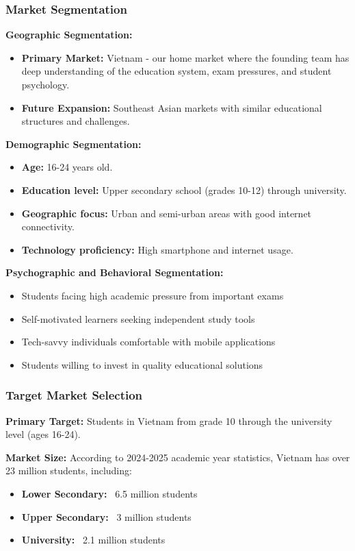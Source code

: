 \subsubsection{Market Segmentation}
\textbf{Geographic Segmentation:}
\begin{itemize}
    \item \textbf{Primary Market:}
        Vietnam - our home market where the founding team has deep understanding of the education system, exam
        pressures, and student psychology.
    \item \textbf{Future Expansion:}
        Southeast Asian markets with similar educational structures and challenges.
\end{itemize}

\textbf{Demographic Segmentation:}
\begin{itemize}
    \item \textbf{Age:} 16-24 years old.
    \item \textbf{Education level:} Upper secondary school (grades 10-12) through university.
    \item \textbf{Geographic focus:} Urban and semi-urban areas with good internet connectivity.
    \item \textbf{Technology proficiency:} High smartphone and internet usage.
\end{itemize}

\textbf{Psychographic and Behavioral Segmentation:}
\begin{itemize}
    \item Students facing high academic pressure from important exams
    \item Self-motivated learners seeking independent study tools
    \item Tech-savvy individuals comfortable with mobile applications
    \item Students willing to invest in quality educational solutions
\end{itemize}

\subsubsection{Target Market Selection}
\textbf{Primary Target:} Students in Vietnam from grade 10 through the university level (ages 16-24).

\textbf{Market Size:} According to 2024-2025 academic year statistics, Vietnam has over 23 million students, including:
\begin{itemize}
    \item \textbf{Lower Secondary:} ~6.5 million students
    \item \textbf{Upper Secondary:} ~3 million students
    \item \textbf{University:} ~2.1 million students
\end{itemize}

